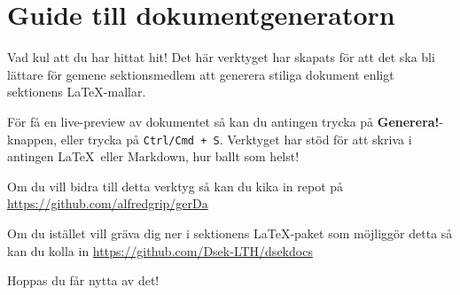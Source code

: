 \documentclass{dsekdoc}
\begin{document}
\setdate{\today}

\section*{Guide till dokumentgeneratorn}
Vad kul att du har hittat hit! 
Det här verktyget har skapats för att det ska bli lättare för gemene sektionsmedlem
att generera stiliga dokument enligt sektionens \LaTeX-mallar.

För få en live-preview av dokumentet så kan du antingen trycka på \textbf{Generera!}-knappen, eller trycka på \texttt{Ctrl/Cmd + S}.
Verktyget har stöd för att skriva i antingen \LaTeX~eller Markdown, hur ballt som helst!

Om du vill bidra till detta verktyg så kan du kika in repot på \url{
    https://github.com/alfredgrip/gerDa
}

Om du istället vill gräva dig ner i sektionens \LaTeX-paket som möjliggör detta så kan du kolla in \url{
    https://github.com/Dsek-LTH/dsekdocs
}

Hoppas du får nytta av det!
\end{document}
